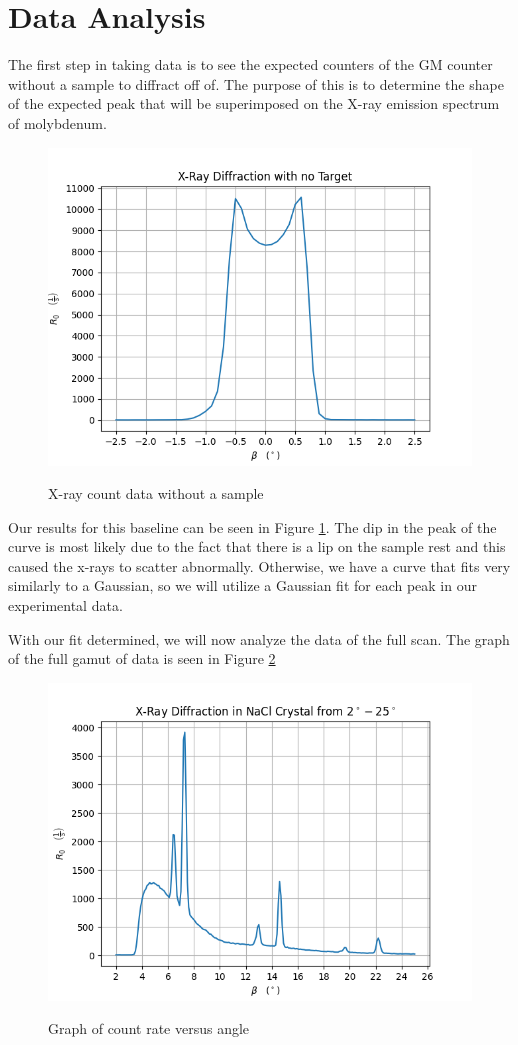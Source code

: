 \documentclass[twocolumn]{article}
\begin{document}
	\section{Data Analysis}
			The first step in taking data is to see the expected counters of the GM counter without a sample to diffract off of. The purpose of this is to determine the shape of the expected peak that will be superimposed on the X-ray emission spectrum of molybdenum. 
			\begin{figure}
				\centering
				\includegraphics[width = .5\textwidth]{../Graphs/ZeroData}
				\label{zerodata}
				\caption{X-ray count data without a sample}
			\end{figure}
			Our results for this baseline can be seen in Figure \ref{zerodata}. The dip in the peak of the curve is most likely due to the fact that there is a lip on the sample rest and this caused the x-rays to scatter abnormally. Otherwise, we have a curve that fits very similarly to a Gaussian, so we will utilize a Gaussian fit for each peak in our experimental data. 
			
			With our fit determined, we will now analyze the data of the full scan. The graph of the full gamut of data is seen in Figure \ref{fulldata}
			\begin{figure}
				\centering
				\includegraphics[width = .5\textwidth]{../Graphs/FullData}
				\label{fulldata}
				\caption{Graph of count rate versus angle }
			\end{figure}
			
\end{document}
